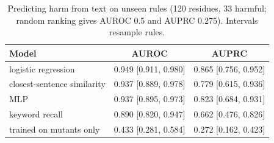 \begin{table}[t]
\centering\small\setlength{\tabcolsep}{4pt}
\caption{Predicting harm from text on unseen rules (120 residues, 33 harmful; random ranking gives AUROC 0.5 and AUPRC 0.275). Intervals resample rules.}\label{tab:predict}
\begin{tabular}{lcc}
\toprule
Model & AUROC & AUPRC \\
\midrule
logistic regression & 0.949 [0.911, 0.980] & 0.865 [0.756, 0.952] \\
closest-sentence similarity & 0.937 [0.889, 0.978] & 0.779 [0.615, 0.936] \\
MLP & 0.937 [0.895, 0.973] & 0.823 [0.684, 0.931] \\
keyword recall & 0.890 [0.820, 0.947] & 0.662 [0.476, 0.826] \\
trained on mutants only & 0.433 [0.281, 0.584] & 0.272 [0.162, 0.423] \\
\bottomrule
\end{tabular}
\end{table}
